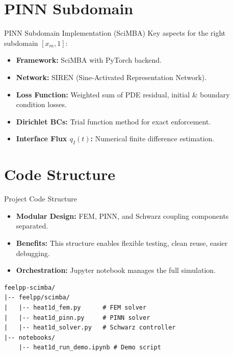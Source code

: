 \documentclass{beamer}
\begin{document}
\section{PINN Subdomain} 
\begin{frame}{PINN Subdomain Implementation (SciMBA)}
  Key aspects for the right subdomain \([x_m,1]\):
  \begin{itemize}
    \item \textbf{Framework:} SciMBA with PyTorch backend. 
    \item \textbf{Network:} SIREN (Sine-Activated Representation Network). 
    \item \textbf{Loss Function:} Weighted sum of PDE residual, initial \& boundary condition losses.
    \item \textbf{Dirichlet BCs:} Trial function method for exact enforcement. 
    \item \textbf{Interface Flux \(q_I(t)\):} Numerical finite difference estimation.
  \end{itemize}
\end{frame}

\section{Code Structure} 
\begin{frame}[fragile]{Project Code Structure}
\begin{itemize}
    \item \textbf{Modular Design:} FEM, PINN, and Schwarz coupling components separated. 
    \item \textbf{Benefits:} This structure enables flexible testing, clean reuse, easier debugging. 
    \item \textbf{Orchestration:} Jupyter notebook manages the full simulation.
\end{itemize}

\begin{center}
\begin{minipage}{0.8\textwidth}
\begin{lstlisting}[basicstyle=\ttfamily\scriptsize]
feelpp-scimba/
|-- feelpp/scimba/
|   |-- heat1d_fem.py      # FEM solver
|   |-- heat1d_pinn.py     # PINN solver
|   |-- heat1d_solver.py   # Schwarz controller
|-- notebooks/
    |-- heat1d_run_demo.ipynb # Demo script
\end{lstlisting}
\end{minipage}
\end{center}
\end{frame}
\end{document}
